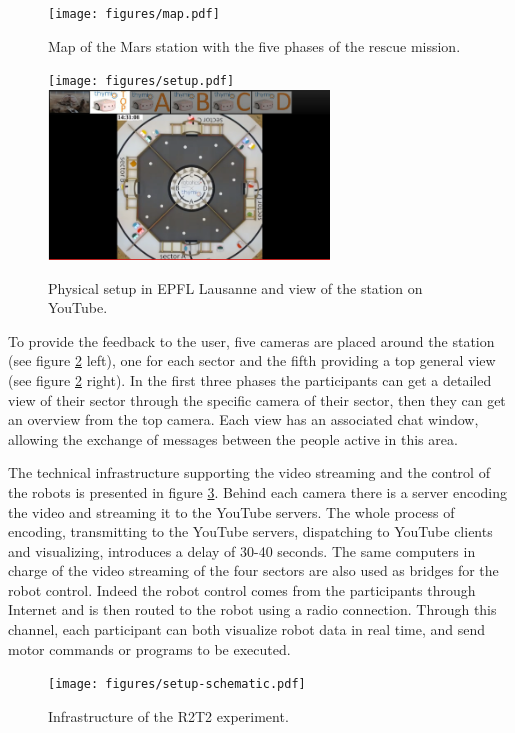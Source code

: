 \documentclass{intech-journal}
\begin{document}
\begin{figure}[ht]
 \centering
    \texttt{[image: figures/map.pdf]}
  \caption{Map of the Mars station with the five phases of the rescue mission.}
  \label{fig:map} 
\end{figure}

\begin{figure}[ht]
 \centering
    \texttt{[image: figures/setup.pdf]}
    \includegraphics[height=45mm]{figures/youtube-view.png}
  \caption{Physical setup in EPFL Lausanne and view of the station on YouTube.}
  \label{fig:setup-physical} 
\end{figure}

To provide the feedback to the user, five cameras are placed around the station (see figure \ref{fig:setup-physical} left), one for each sector and the fifth providing a top general view (see figure \ref{fig:setup-physical} right).
In the first three phases the participants can get a detailed view of their sector through the specific camera of their sector, then they can get an overview from the top camera.
Each view has an associated chat window, allowing the exchange of messages between the people active in this area.

The technical infrastructure supporting the video streaming and the control of the robots is presented in figure \ref{fig:setup-scheme}.
Behind each camera there is a server encoding the video and streaming it to the YouTube servers. 
The whole process of encoding, transmitting to the YouTube servers, dispatching to YouTube clients and visualizing, introduces a delay of 30-40 seconds.
The same computers in charge of the video streaming of the four sectors are also used as bridges for the robot control. 
Indeed the robot control comes from the participants through Internet and is then routed to the robot using a radio connection. 
Through this channel, each participant can both visualize robot data in real time, and send motor commands or programs to be executed. 


\begin{figure}[ht]
 \centering
    \texttt{[image: figures/setup-schematic.pdf]}
  \caption{Infrastructure of the R2T2 experiment.}
  \label{fig:setup-scheme} 
\end{figure}
\end{document}
